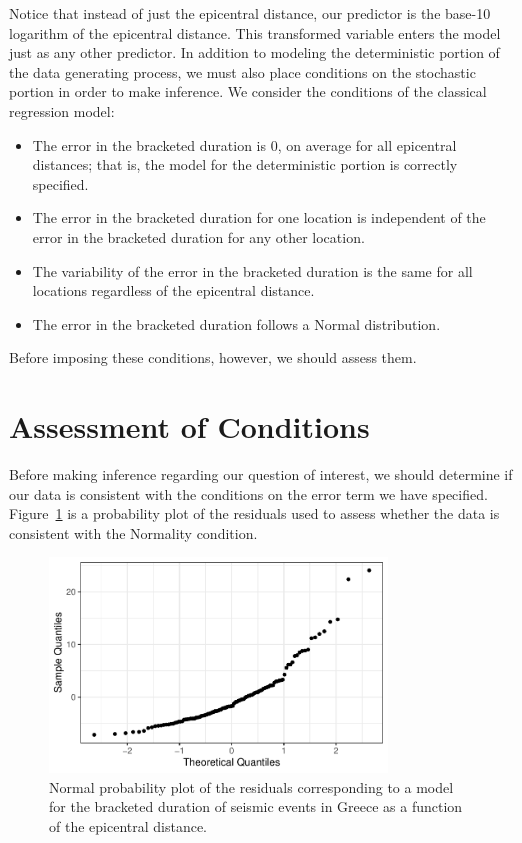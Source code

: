 \documentclass[
  letterpaper,
  DIV=11,
  numbers=noendperiod]{scrreprt}
\providecommand{\tightlist}{%
  \setlength{\itemsep}{0pt}\setlength{\parskip}{0pt}}\usepackage{longtable,booktabs,array}
\theoremstyle{plain}
\theoremstyle{definition}
\theoremstyle{definition}
\theoremstyle{remark}
\begin{document}
Notice that instead of just the epicentral distance, our predictor is
the base-10 logarithm of the epicentral distance. This transformed
variable enters the model just as any other predictor. In addition to
modeling the deterministic portion of the data generating process, we
must also place conditions on the stochastic portion in order to make
inference. We consider the conditions of the classical regression model:

\begin{itemize}
\tightlist
\item
  The error in the bracketed duration is 0, on average for all
  epicentral distances; that is, the model for the deterministic portion
  is correctly specified.
\item
  The error in the bracketed duration for one location is independent of
  the error in the bracketed duration for any other location.
\item
  The variability of the error in the bracketed duration is the same for
  all locations regardless of the epicentral distance.
\item
  The error in the bracketed duration follows a Normal distribution.
\end{itemize}

Before imposing these conditions, however, we should assess them.

\hypertarget{assessment-of-conditions}{%
\section{Assessment of Conditions}\label{assessment-of-conditions}}

Before making inference regarding our question of interest, we should
determine if our data is consistent with the conditions on the error
term we have specified. Figure~\ref{fig-regrecap-normality} is a
probability plot of the residuals used to assess whether the data is
consistent with the Normality condition.

\begin{figure}

{\centering \includegraphics[width=0.8\textwidth,height=\textheight]{./images/fig-regrecap-normality-1.pdf}

}

\caption{\label{fig-regrecap-normality}Normal probability plot of the
residuals corresponding to a model for the bracketed duration of seismic
events in Greece as a function of the epicentral distance.}

\end{figure}
\end{document}
